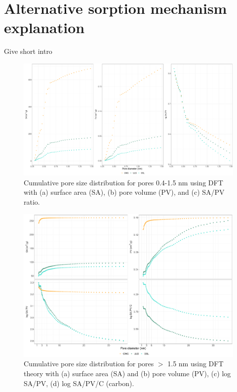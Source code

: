 \section{Alternative sorption mechanism explanation}
Give short intro 

\begin{figure}[htb]
    \centering
    \includegraphics[width=\textwidth]{R/figs/PZD_appendix_small.pdf}
    \caption{Cumulative pore size distribution for pores 0.4-1.5 nm using DFT with (a) surface area (SA), (b) pore volume (PV), and (c) SA/PV ratio.}
    \label{appfig:PZD_small}
\end{figure}

\begin{figure}[htb]
    \centering
    \includegraphics[width=\textwidth]{R/figs/PSD_appendix_large.pdf}
    \caption{Cumulative pore size distribution for pores $>$ 1.5 nm using DFT theory with (a) surface area (SA) and (b) pore volume (PV), (c) log SA/PV, (d) log SA/PV/C (carbon).}
    \label{appfig:PZD_large}
\end{figure}

